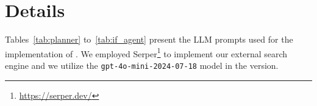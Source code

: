 \section{\ourmethod Details}
\label{sec:app_method}

Tables~\ref{tab:planner} to~\ref{tab:if_agent} present the LLM prompts used for the implementation of \ourmethod. We employed Serper\footnote{\url{https://serper.dev/}} to implement our external search engine and we utilize the \texttt{gpt-4o-mini-2024-07-18} model in the \ourmethodmini version.


